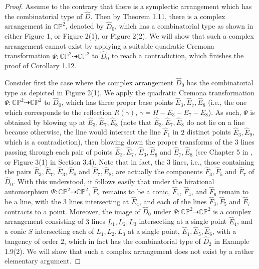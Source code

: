 \documentclass[11pt]{amsart}
\theoremstyle{plain}
\numberwithin{theorem}{section}
\theoremstyle{definition}
\newcommand{\C}{{\mathbb C}}
\renewcommand{\P}{{\mathbb P}}
\begin{document}
\begin{proof}
Assume to the contrary that there is a symplectic arrangement which has the combinatorial type of $\hat{D}$. 
Then by Theorem 1.11, there is a complex arrangement in $\C\P^2$, denoted by $\hat{D}_0$, which has a combinatorial type as shown in either Figure 1, or Figure 2(1), or Figure 2(2). We will show that such a complex arrangement cannot exist by applying a suitable quadratic Cremona transformation $\Psi: \C\P^2\dashrightarrow \C\P^2$ to $\hat{D}_0$ to reach a contradiction, which finishes the proof of Corollary 1.12.

Consider first the case where the complex arrangement $\hat{D}_0$ has the combinatorial type as depicted in Figure 2(1). We apply the quadratic Cremona transformation $\Psi: \C\P^2\dashrightarrow \C\P^2$ to 
$\hat{D}_0$, which has three proper base points $\hat{E}_3, \hat{E}_7,\hat{E}_8$ (i.e., the one which 
corresponds to the reflection $R(\gamma)$, $\gamma=H-E_3-E_7-E_8$). As such, $\Psi$ is obtained by blowing up at $\hat{E}_3,\hat{E}_7,\hat{E}_8$ (note that $\hat{E}_3,\hat{E}_7,\hat{E}_8$ do not lie on a line
because otherwise, the line would intersect the line $\hat{F}_1$ in $2$ distinct points $\hat{E}_3, \hat{E}_9$, which is a contradiction), then blowing down the proper transforms of the 
$3$ lines passing through each pair of points $\hat{E}_3,\hat{E}_7$, $\hat{E}_3,\hat{E}_8$ and 
$\hat{E}_7,\hat{E}_8$ (see Chapter 5 in \cite{Moe}, or Figure 3(1) in Section 3.4). 
Note that in fact, the $3$ lines, i.e., 
those containing the pairs $\hat{E}_3,\hat{E}_7$, $\hat{E}_3,\hat{E}_8$ and $\hat{E}_7,\hat{E}_8$, are actually the components $\hat{F}_3,\hat{F}_5$ and $\hat{F}_7$ of $\hat{D}_0$. With this understood, it follows easily that under the birational automorphism $\Psi: \C\P^2\dashrightarrow \C\P^2$, $\hat{F}_2$ remains to be a conic,
$\hat{F}_1$, $\hat{F}_4$, and $\hat{F}_6$ remain to be a line, with the $3$ lines intersecting at $\hat{E}_4$, 
and each of the lines $\hat{F}_3,\hat{F}_5$ and $\hat{F}_7$ contracts to a point.  
Moreover, the image of $\hat{D}_0$ under 
$\Psi: \C\P^2\dashrightarrow \C\P^2$ is a complex arrangement consisting of $3$ lines $L_1,L_2,L_3$ intersecting at a single point $\hat{E}_4$, and a conic $S$ intersecting each of $L_1,L_2,L_3$ at a single point, 
$\hat{E}_1,\hat{E}_5,\hat{E}_6$, with a tangency of order $2$, which in fact has the combinatorial type of 
$\hat{D}_2$ in Example 1.9(2). We will show that such a complex arrangement 
does not exist by a rather elementary argument. 


\end{proof}
\end{document}
